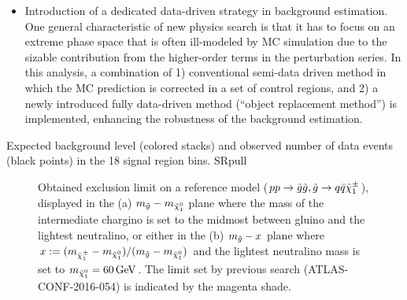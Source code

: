 \documentclass {article}
\begin{document}
{\begin{itemize}
\item Introduction of a dedicated data-driven strategy in background estimation.
One general characteristic of new physics search is that it has to focus on an extreme phase space that is often ill-modeled by MC simulation due to the sizable contribution from the higher-order terms in the perturbation series.
In this analysis, a combination of 1) conventional semi-data driven method in which the MC prediction is corrected in a set of control regions, and 2) a newly introduced fully data-driven method (``object replacement method'') is implemented, enhancing the robustness of the background estimation. \\
\end{itemize}


{Expected background level (colored stacks) and observed number of data events (black points) in the 18 signal region bins.}
{SRpull}


\begin{figure}[h]
  \centering
    \caption{ Obtained exclusion limit on a reference model ($pp \rightarrow \tilde{g}\tilde{g},  \tilde{g} \rightarrow q\bar{q} \tilde{\chi}_{1}^{\pm}$), displayed in the
  (a) $m_{\tilde{g}}-m_{\tilde{\chi}_{1}^{0}}$ plane where the mass of the intermediate chargino is set to the midmost between gluino and the lightest neutralino, or either in the
  (b) $m_{\tilde{g}}-x$ plane where $x:= (m_{\tilde{\chi}_{1}^{\pm}}-m_{\tilde{\chi}_{1}^{0}})/(m_{\tilde{g}}-m_{\tilde{\chi}_{1}^{0}})$ and the lightest neutralino mass is set to $m_{\tilde{\chi}_{1}^{0}}=60\, \mathrm{GeV}$. 
  The limit set by previous search (ATLAS-CONF-2016-054) is indicated by the magenta shade.
  \label{limit_symQQC1} }
\end{figure}


}
\end{document}
